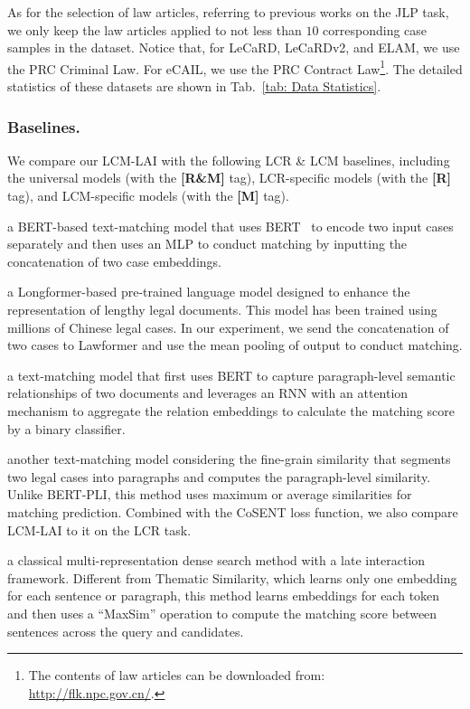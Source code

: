 As for the selection of law articles, referring to previous works on the JLP task, we only keep the law articles applied to not less than $10$ corresponding case samples in the dataset.
Notice that, for LeCaRD, LeCaRDv2, and ELAM, we use the PRC Criminal Law.
For eCAIL, we use the PRC Contract Law\footnote{The contents of law articles can be downloaded from: \url{http://flk.npc.gov.cn/}.}.
The detailed statistics of these datasets are shown in Tab.~\ref{tab: Data Statistics}.

\subsubsection{Baselines.}
We compare our LCM-LAI with the following LCR \& LCM baselines, including the universal models (with the \textbf{[R\&M]} tag), LCR-specific models (with the \textbf{[R]} tag), and LCM-specific models (with the \textbf{[M]} tag).

a BERT-based text-matching model that uses BERT~\cite{devlin2018bert} to encode two input cases separately and then uses an MLP to conduct matching by inputting the concatenation of two case embeddings.

a Longformer-based pre-trained language model designed to enhance the representation of lengthy legal documents. 
This model has been trained using millions of Chinese legal cases.
In our experiment, we send the concatenation of two cases to Lawformer and use the mean pooling of output to conduct matching.

a text-matching model that first uses BERT to capture paragraph-level semantic relationships of two documents and leverages an RNN with an attention mechanism to aggregate the relation embeddings to calculate the matching score by a binary classifier.

 another text-matching model considering the fine-grain similarity that segments two legal cases into paragraphs and computes the paragraph-level similarity. Unlike BERT-PLI, this method uses maximum or average similarities for matching prediction. Combined with the CoSENT loss function, we also compare LCM-LAI to it on the LCR task.

 a classical multi-representation dense search method with a late interaction framework.
Different from Thematic Similarity, which learns only one embedding for each sentence or paragraph, this method learns embeddings for each token and then uses a “MaxSim” operation to compute the matching score between sentences across the query and candidates.


